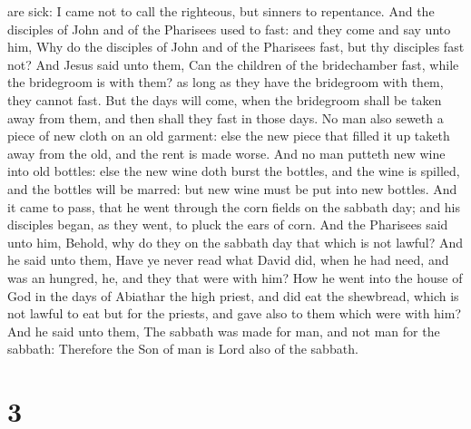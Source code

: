 are sick: I came not to call the righteous, but sinners to repentance.
 And the disciples of John and of the Pharisees used to
fast: and they come and say unto him, Why do the disciples of John and
of the Pharisees fast, but thy disciples fast not?  And
Jesus said unto them, Can the children of the bridechamber fast, while
the bridegroom is with them? as long as they have the bridegroom with
them, they cannot fast.  But the days will come, when the
bridegroom shall be taken away from them, and then shall they fast in
those days.  No man also seweth a piece of new cloth on an
old garment: else the new piece that filled it up taketh away from the
old, and the rent is made worse.  And no man putteth new
wine into old bottles: else the new wine doth burst the bottles, and the
wine is spilled, and the bottles will be marred: but new wine must be
put into new bottles.  And it came to pass, that he went
through the corn fields on the sabbath day; and his disciples began, as
they went, to pluck the ears of corn.  And the Pharisees
said unto him, Behold, why do they on the sabbath day that which is not
lawful?  And he said unto them, Have ye never read what
David did, when he had need, and was an hungred, he, and they that were
with him?  How he went into the house of God in the days of
Abiathar the high priest, and did eat the shewbread, which is not lawful
to eat but for the priests, and gave also to them which were with him?
 And he said unto them, The sabbath was made for man, and
not man for the sabbath:  Therefore the Son of man is Lord
also of the sabbath.

\hypertarget{section-2}{%
\section{3}\label{section-2}}

